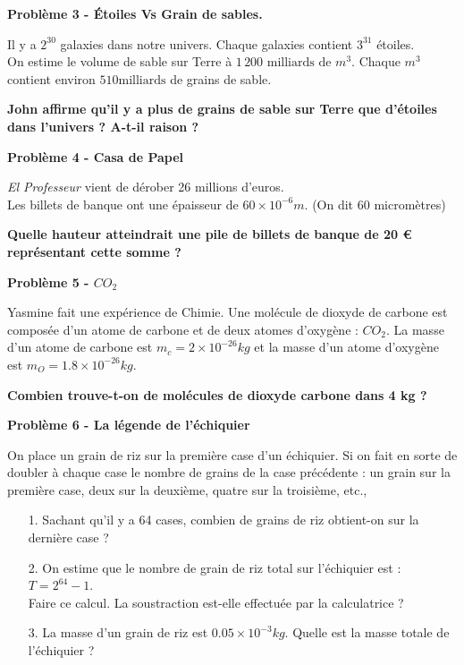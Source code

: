 \textbf{Problème 3 - Étoiles Vs Grain de sables.}

Il y a $2^{30}$ galaxies dans notre univers. Chaque galaxies contient $3^{31}$ étoiles.  \\
On estime le volume de sable sur Terre à $1\,200 \text{ milliards de } m^3$. Chaque $m^3$ contient environ $510 \text{milliards}$ de grains de sable. 

\textbf{John affirme qu'il y a plus de grains de sable sur Terre que d'étoiles dans l'univers ? A-t-il raison ?}

\Pointilles[5]

\textbf{Problème 4 - Casa de Papel}

\textit{\og El Professeur \fg{} } vient de dérober 26 millions d’euros. \\
Les billets de banque ont une épaisseur de $60 \times 10^{-6} m$. (On dit 60 micromètres)

\textbf{Quelle hauteur atteindrait une pile de billets de banque de 20 \euro{} représentant cette somme ?}

\Pointilles[6]

\textbf{Problème 5 - $CO_2$}

Yasmine fait une expérience de Chimie. Une molécule de dioxyde de carbone est composée d'un atome de carbone et de deux atomes d'oxygène : $CO_2$. La masse d'un atome de carbone est $ m_c = 2 \times 10^{-26}kg$ et la masse d'un atome d'oxygène est $ m_O = 1.8 \times 10^{-26}kg$. 

\textbf{Combien trouve-t-on de molécules de dioxyde carbone dans 4 kg ?}

\Pointilles[6]

\textbf{Problème 6 - La légende de l'échiquier}

\og On place un grain de riz sur la première case d'un échiquier. Si on fait en sorte de doubler à chaque case le nombre de grains de la case précédente : un grain sur la première case, deux sur la deuxième, quatre sur la troisième, etc.,

\begin{itemize}
    \item[1.] Sachant qu'il y a 64 cases, combien de grains de riz obtient-on sur la dernière case ? 
    \item[2.] On estime que le nombre de grain de riz total sur l'échiquier est : $T = 2^{64} - 1$. \\
    Faire ce calcul. La soustraction est-elle effectuée par la calculatrice ?
    \item[3.] La masse d'un grain de riz est $0.05 \times 10^{-3} kg$. Quelle est la masse totale de l'échiquier ? 
\end{itemize}

